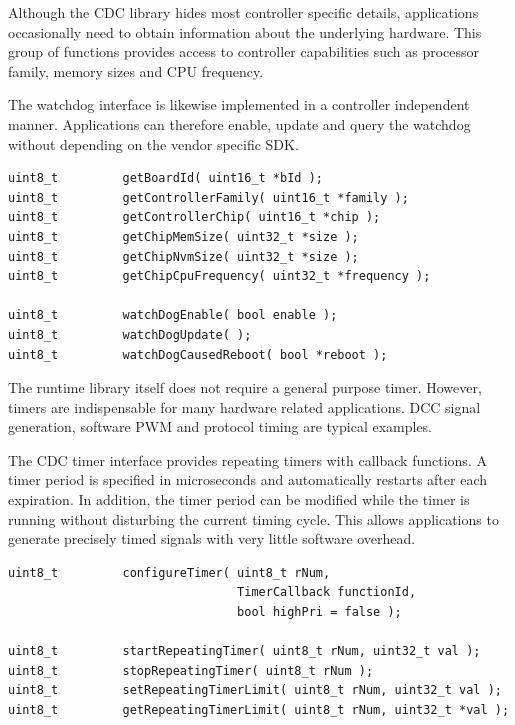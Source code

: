 
Although the CDC library hides most controller specific details, applications
occasionally need to obtain information about the underlying hardware. This
group of functions provides access to controller capabilities such as processor
family, memory sizes and CPU frequency.

The watchdog interface is likewise implemented in a controller independent
manner. Applications can therefore enable, update and query the watchdog
without depending on the vendor specific SDK.

\lstset{language=c++, style=api-interface}
\begin{lstlisting}
uint8_t         getBoardId( uint16_t *bId );
uint8_t         getControllerFamily( uint16_t *family );
uint8_t         getControllerChip( uint16_t *chip );
uint8_t         getChipMemSize( uint32_t *size );
uint8_t         getChipNvmSize( uint32_t *size );
uint8_t         getChipCpuFrequency( uint32_t *frequency );

uint8_t         watchDogEnable( bool enable );
uint8_t         watchDogUpdate( );
uint8_t         watchDogCausedReboot( bool *reboot );
\end{lstlisting}
\FloatBarrier


The runtime library itself does not require a general purpose timer. However,
timers are indispensable for many hardware related applications. DCC signal
generation, software PWM and protocol timing are typical examples.

The CDC timer interface provides repeating timers with callback functions. A
timer period is specified in microseconds and automatically restarts after each
expiration. In addition, the timer period can be modified while the timer is
running without disturbing the current timing cycle. This allows applications to
generate precisely timed signals with very little software overhead.

\lstset{language=c++, style=api-interface}
\begin{lstlisting}
uint8_t         configureTimer( uint8_t rNum, 
                                TimerCallback functionId, 
                                bool highPri = false );

uint8_t         startRepeatingTimer( uint8_t rNum, uint32_t val );
uint8_t         stopRepeatingTimer( uint8_t rNum );
uint8_t         setRepeatingTimerLimit( uint8_t rNum, uint32_t val );
uint8_t         getRepeatingTimerLimit( uint8_t rNum, uint32_t *val );
\end{lstlisting}
\FloatBarrier

